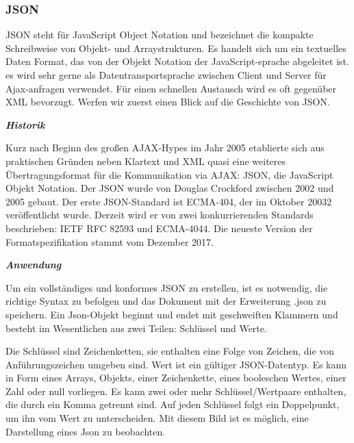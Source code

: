 \subsubsection{JSON}

JSON steht für JavaScript Object Notation und bezeichnet die kompakte Schreibweise von Objekt- und Arraystrukturen.\cite{philipp524} Es handelt sich um ein textuelles Daten Format, das von der Objekt Notation der JavaScript-sprache abgeleitet ist. es wird sehr gerne als Datentransportsprache zwischen Client und Server für Ajax-anfragen verwendet. Für einen schnellen Austausch wird es oft gegenüber XML bevorzugt. Werfen wir zuerst einen Blick auf die Geschichte von JSON. 

\textit{\textbf{Historik}}

Kurz nach Beginn des großen AJAX-Hypes im Jahr 2005 etablierte sich aus praktischen Gründen neben Klartext und XML quasi eine weiteres Übertragungsformat für die Kommunikation via AJAX: JSON, die JavaScript Objekt Notation.\cite{philipp658}
Der JSON wurde von Douglas Crockford zwischen 2002 und 2005 gebaut. Der erste JSON-Standard ist ECMA-404, der im Oktober 20032 veröffentlicht wurde. Derzeit wird er von zwei konkurrierenden Standards beschrieben: IETF RFC 82593 und ECMA-4044. Die neueste Version der Formatspezifikation stammt vom Dezember 2017. \cite{wikip01}

\textit{\textbf{Anwendung}}

Um ein vollständiges und konformes JSON zu erstellen, ist es notwendig, die richtige Syntax zu befolgen und das Dokument mit der Erweiterung .json zu speichern. Ein Json-Objekt beginnt und endet mit geschweiften Klammern {} und besteht im Wesentlichen aus zwei Teilen: Schlüssel und Werte. 

Die Schlüssel sind Zeichenketten, sie enthalten eine Folge von Zeichen, die von Anführungszeichen umgeben sind. Wert ist ein gültiger JSON-Datentyp. Es kann in Form eines Arrays, Objekts, einer Zeichenkette, eines booleschen Wertes, einer Zahl oder null vorliegen. Es kann zwei oder mehr Schlüssel/Wertpaare enthalten, die durch ein Komma getrennt sind. Auf jeden Schlüssel folgt ein Doppelpunkt, um ihn vom Wert zu unterscheiden. Mit diesem Bild ist es möglich, eine Darstellung eines Json zu beobachten. 

